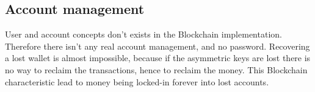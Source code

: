 \subsection{Account management}

User and account concepts don't exists in the Blockchain implementation.
Therefore there isn't any real account management, and no password. Recovering a
lost wallet is almost impossible, because if the asymmetric keys are lost there
is no way to reclaim the transactions, hence to reclaim the money. This
Blockchain characteristic lead to money being locked-in forever into lost
accounts.
